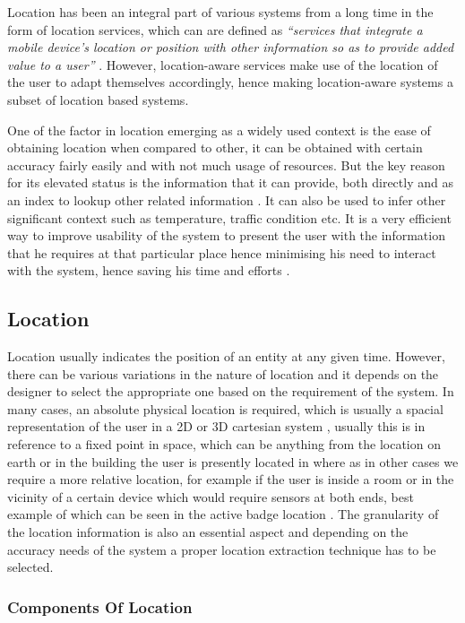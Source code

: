 \documentclass[12pt]{report}
\begin{document}
Location has been an integral part of various systems from a long time in the form of location services, which can are defined as \textit{``services that integrate a mobile device's location or position with other information so as to provide added value to a user''} \cite{schiller2004location}. However, location-aware services make use of the location of the user to adapt themselves accordingly, hence making location-aware systems a subset of location based systems. 


One of the factor in location emerging as a widely used context is the ease of obtaining location when compared to other, it can be obtained with certain accuracy fairly easily and with not much usage of resources.  But the key reason for its elevated status is the information that it can provide, both directly and as an index to lookup other related information \cite{schilit1995system}. It can also be used to infer other significant context such as temperature, traffic condition etc. It is a very efficient way to improve usability of the system to present the user with the information that he requires at that particular place hence minimising his need to interact with the system, hence saving his time and efforts \cite{kaasinen2003user}.


\subsection{Location}

Location usually indicates the position of an entity at any given time. However, there can be various variations in the nature of location and it depends on the designer to select the appropriate one based on the requirement of the system. In many cases, an absolute physical location is required, which is usually a spacial representation of the user in a 2D or 3D cartesian system \cite{rodden1998exploiting}, usually this is in reference to a fixed point in space, which can be anything from the location on earth or in the building the user is presently located in where as in other cases we require a more relative location, for example if the user is inside a room or in the vicinity of a certain device which would require sensors at both ends, best example of which can be seen in the active badge location \cite{want1992active}. The granularity of the location information is also an essential aspect and depending on the accuracy needs of the system a proper location extraction technique has to be selected.


\subsubsection{Components Of Location}
\end{document}
